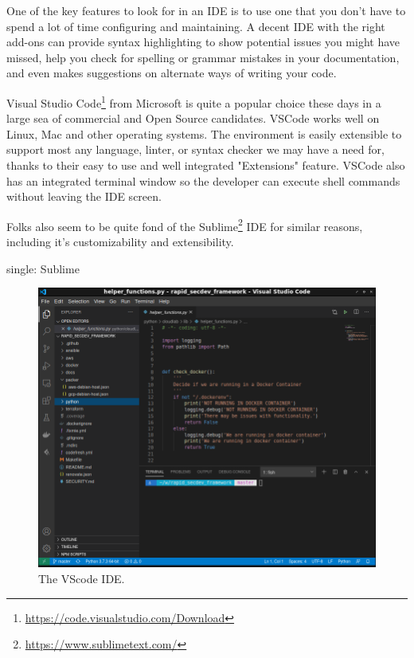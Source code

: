 \justify
One of the key features to look for in an IDE is to use one that you
don't have to spend a lot of time configuring and maintaining. A decent
IDE with the right add-ons can provide syntax highlighting to show
potential issues you might have missed, help you check for spelling or
grammar mistakes in your documentation, and even makes suggestions on
alternate ways of writing your code.

\justify
Visual Studio Code\footnote{\url{https://code.visualstudio.com/Download}}
from Microsoft is quite a popular choice these days in a large sea of
commercial and Open Source candidates. VSCode works well on Linux, Mac
and other operating systems. The environment is easily extensible to
support most any language, linter, or syntax checker we may have a need
for, thanks to their easy to use and well integrated "Extensions"
feature. VSCode also has an integrated terminal window so the developer
can execute shell commands without leaving the IDE screen.
 
\justify
Folks also seem to be quite fond of the Sublime\footnote{\url{https://www.sublimetext.com/}} IDE for similar reasons, including it's customizability and extensibility.

single: Sublime

\begin{figure}
\centering
\includegraphics[scale=0.45]{../images/setup-vscode.png}
\caption{The VScode IDE.}
\end{figure}

